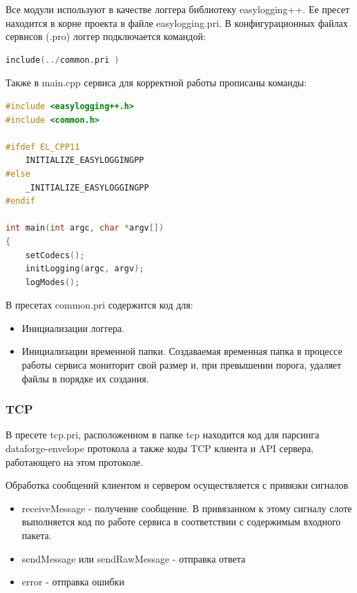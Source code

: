 \documentclass[a4paper,14pt]{extreport}
\begin{document}
Все модули используют в качестве логгера библиотеку easylogging++. Ее пресет находится в корне проекта в файле easylogging.pri. В конфигурационных файлах сервисов (.pro) логгер подключается командой:

\begin{lstlisting}[language=C++, caption={Подключение пресета common.}, captionpos=b]
include(../common.pri )
\end{lstlisting}

Также в main.cpp сервиса для корректной работы прописаны команды:

\begin{lstlisting}[language=C++, caption={Инициализация пресета common.}, captionpos=b]
#include <easylogging++.h>
#include <common.h>

#ifdef EL_CPP11
    INITIALIZE_EASYLOGGINGPP
#else
    _INITIALIZE_EASYLOGGINGPP
#endif

int main(int argc, char *argv[])
{
    setCodecs();
    initLogging(argc, argv);
    logModes();
\end{lstlisting}

В пресетах common.pri содержится код для:
\begin{itemize}
\item Инициализации логгера.
\item Инициализации временной папки. Создаваемая временная папка в процессе работы сервиса мониторит свой размер и, при превышении порога, удаляет файлы в порядке их создания.
\end{itemize}

\subsubsection{TCP}

В пресете tcp.pri, расположенном в папке tcp находится код для парсинга dataforge-envelope протокола а также коды TCP клиента и API сервера, работающего на этом протоколе. 

Обработка сообщений клиентом и сервером осуществляется с привязки сигналов

\begin{itemize}
    \item receiveMessage - получение сообщение. В привязанном к этому сигналу слоте выполняется код по работе сервиса в соответствии с содержимым входного пакета. 
    \item sendMessage или sendRawMessage - отправка ответа
    \item error - отправка ошибки
\end{itemize}
\end{document}

